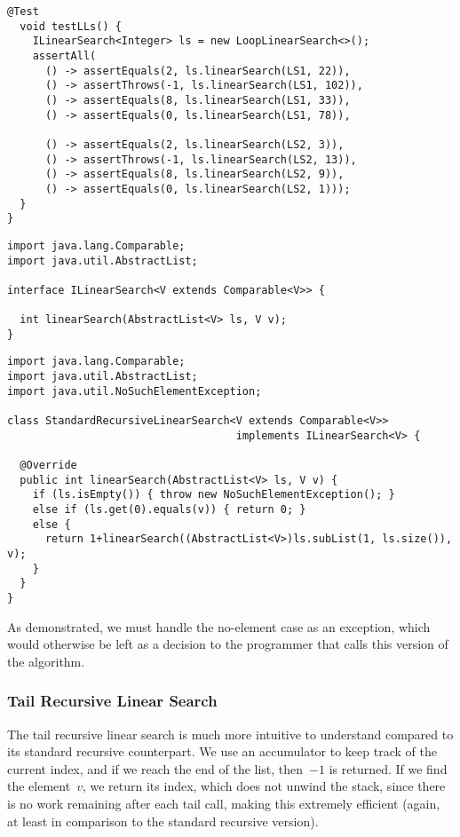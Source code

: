 \begin{lstlisting}[language=MyJava]
  @Test
  void testLLs() {
    ILinearSearch<Integer> ls = new LoopLinearSearch<>();
    assertAll(
      () -> assertEquals(2, ls.linearSearch(LS1, 22)),
      () -> assertThrows(-1, ls.linearSearch(LS1, 102)),
      () -> assertEquals(8, ls.linearSearch(LS1, 33)),
      () -> assertEquals(0, ls.linearSearch(LS1, 78)),

      () -> assertEquals(2, ls.linearSearch(LS2, 3)),
      () -> assertThrows(-1, ls.linearSearch(LS2, 13)),
      () -> assertEquals(8, ls.linearSearch(LS2, 9)),
      () -> assertEquals(0, ls.linearSearch(LS2, 1)));
  }
}
\end{lstlisting}

\begin{lstlisting}[language=MyJava]
import java.lang.Comparable;
import java.util.AbstractList;

interface ILinearSearch<V extends Comparable<V>> {
  
  int linearSearch(AbstractList<V> ls, V v);
}
\end{lstlisting}

\begin{lstlisting}[language=MyJava]
import java.lang.Comparable;
import java.util.AbstractList;
import java.util.NoSuchElementException;
  
class StandardRecursiveLinearSearch<V extends Comparable<V>> 
                                    implements ILinearSearch<V> {
  
  @Override
  public int linearSearch(AbstractList<V> ls, V v) {
    if (ls.isEmpty()) { throw new NoSuchElementException(); }
    else if (ls.get(0).equals(v)) { return 0; }
    else { 
      return 1+linearSearch((AbstractList<V>)ls.subList(1, ls.size()), v); 
    }
  }
}
\end{lstlisting}

As demonstrated, we must handle the no-element case as an exception, which would otherwise be left as a decision to the programmer that calls this version of the  algorithm.

\subsubsection*{Tail Recursive Linear Search}

The tail recursive linear search is much more intuitive to understand compared to its standard recursive counterpart. 
We use an accumulator to keep track of the current index, and if we reach the end of the list, then~$-1$ is returned. 
If we find the element~$v$, we return its index, which does not unwind the stack, since there is no work remaining after each tail call, making this extremely efficient (again, at least in comparison to the standard recursive version).

